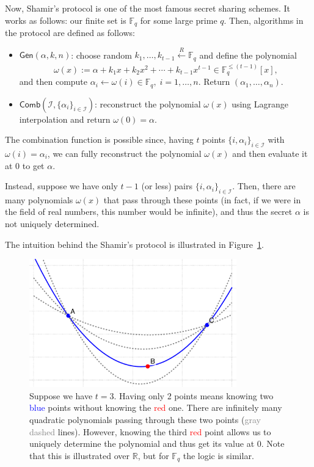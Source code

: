 \documentclass[../lecture-notes.tex]{subfiles}
\begin{document}
Now, Shamir's protocol is one of the most famous secret sharing schemes. It works as follows: our finite set is $\mathbb{F}_q$ for some large prime $q$. Then, algorithms in the protocol are defined as follows:
\begin{itemize}
    \item $\mathsf{Gen}(\alpha, k, n)$: choose random $k_1,\dots,k_{t-1} \xleftarrow[]{R} \mathbb{F}_q$ and define the polynomial
    \begin{equation}
        \omega(x) := \alpha + k_1x + k_2x^2 + \cdots + k_{t-1}x^{t-1} \in \mathbb{F}_q^{\leq (t-1)}[x],     
    \end{equation}
    and then compute $\alpha_i \gets \omega(i) \in \mathbb{F}_q, \; i = 1,\dots,n$. Return $(\alpha_1,\dots,\alpha_n)$.
    \item $\mathsf{Comb}(\mathcal{I}, \{\alpha_i\}_{i \in \mathcal{I}})$: reconstruct the polynomial $\omega(x)$ using Lagrange interpolation and return $\omega(0) = \alpha$.
\end{itemize}

The combination function is possible since, having $t$ points $\{i,\alpha_i\}_{i \in \mathcal{I}}$ with $\omega(i) = \alpha_i$, we can fully reconstruct the polynomial $\omega(x)$ and then evaluate it at $0$ to get $\alpha$.

Instead, suppose we have only $t-1$ (or less) pairs $\{i,\alpha_i\}_{i \in \mathcal{I}}$. Then, there are many polynomials $\omega(x)$ that pass through these points (in fact, if we were in the field of real numbers, this number would be infinite), and thus the secret $\alpha$ is not uniquely determined.

The intuition behind the Shamir's protocol is illustrated in Figure~\ref{fig:shamir}.

\begin{figure}
    \centering
    \includegraphics[width=0.8\textwidth]{images/lecture_1/shamir_demo.pdf}
    \caption{Suppose we have $t=3$. Having only 2 points means knowing two \textcolor{blue}{blue} points without knowing the \textcolor{red}{red} one. There are infinitely many quadratic polynomials passing through these two points (\textcolor{gray}{gray dashed} lines). However, knowing the third \textcolor{red}{red} point allows us to uniquely determine the polynomial and thus get its value at $0$. Note that this is illustrated over $\mathbb{R}$, but for $\mathbb{F}_q$ the logic is similar.}
    \label{fig:shamir}
\end{figure}
\end{document}
